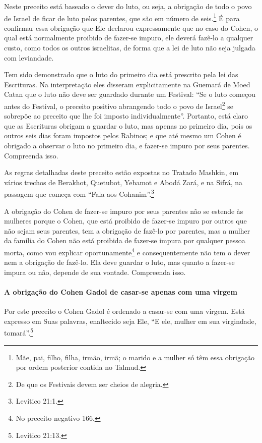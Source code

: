 Neste preceito está baseado o dever do luto, ou seja, a obrigação de
todo o povo de Israel de ficar de luto pelos parentes, que são em número
de seis.\footnote{Mãe, pai, filho, filha, irmão, irmã; o marido e a mulher só têm essa
  obrigação por ordem posterior contida no Talmud.} É para confirmar essa obrigação que Ele
declarou expressamente que no caso do Cohen, o qual está normalmente proibido de fazer-se impuro, ele deverá fazê-lo a qualquer custo, como todos os outros israelitas, de forma que a lei de luto não seja julgada com leviandade.

Tem sido demonstrado que o luto do primeiro dia está prescrito pela lei
das Escrituras. Na interpretação eles disseram explicitamente na Guemará
de Moed Catan que o luto não deve ser guardado durante um Festival: ``Se
o luto começou antes do Festival, o preceito positivo abrangendo todo o
povo de Israel\footnote{De que os Festivais devem ser cheios de alegria.} se sobrepõe ao preceito que lhe foi
imposto individualmente''. Portanto, está claro que as Escrituras obrigam a guardar o luto, mas apenas no primeiro dia, pois os outros seis dias foram impostos pelos Rabinos; e que
até mesmo um Cohen é obrigado a observar o luto no primeiro dia, e
fazer-se impuro por seus parentes. Compreenda isso.

As regras detalhadas deste preceito estão expostas no Tratado Mashkin, em vários trechos de Berakhot, Quetubot, Yebamot e Abodá Zará, e
na Sifrá, na passagem que começa com ``Fala aos Cohanim''.\footnote{Levítico
21:1.}

A obrigação do Cohen de fazer-se impuro por seus parentes não se
estende às mulheres porque o Cohen, que está proibido de fazer-se
impuro por outros que não sejam seus parentes, tem a obrigação de
fazê-lo por parentes, mas a mulher da família do Cohen não está proibida de
fazer-se impura por qualquer pessoa morta, como vou explicar
oportunamente\footnote{No preceito negativo 166.} e consequentemente não tem o dever nem a obrigação de fazê-lo. Ela deve guardar
o luto, mas quanto a fazer-se impura ou não, depende de sua vontade.
Compreenda isso.

\paragraph{A obrigação do Cohen Gadol de casar-se apenas com uma virgem}

Por este preceito o Cohen Gadol é ordenado a casar-se com uma
virgem. Está expresso em Suas palavras, enaltecido seja Ele, ``E ele,
mulher em sua virgindade, tomará''.\footnote{Levítico 21:13.}

